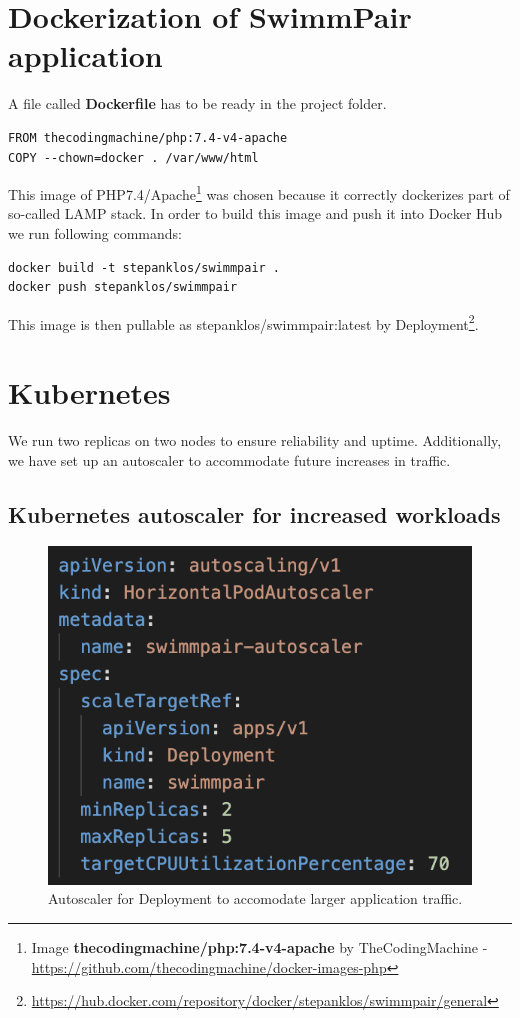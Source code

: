 \section*{Dockerization of SwimmPair application}
A file called \textbf{Dockerfile} has to be ready in the project folder.
\begin{lstlisting}
FROM thecodingmachine/php:7.4-v4-apache
COPY --chown=docker . /var/www/html
\end{lstlisting}
This image of PHP7.4/Apache\footnote{Image \textbf{thecodingmachine/php:7.4-v4-apache}  by TheCodingMachine - \url{https://github.com/thecodingmachine/docker-images-php}} was chosen because it correctly dockerizes part of so-called LAMP stack. In order to build this image and push it into Docker Hub we run following commands:
\begin{lstlisting}
docker build -t stepanklos/swimmpair .
docker push stepanklos/swimmpair
\end{lstlisting}
This image is then pullable as stepanklos/swimmpair:latest by Deployment\footnote{\url{https://hub.docker.com/repository/docker/stepanklos/swimmpair/general}}.
\section*{Kubernetes}
We run two replicas on two nodes to ensure reliability and uptime. Additionally, we have set up an autoscaler to accommodate future increases in traffic.
\subsection*{Kubernetes autoscaler for increased workloads}
\begin{figure}[h]
    \centering	
    \includegraphics[scale=0.52]{img/swimmpair_deloyment_k8s_scaling.png}
    \caption{Autoscaler for Deployment to accomodate larger application traffic.}
    \label{fig5.2:k8sautoscaling}
\end{figure}

